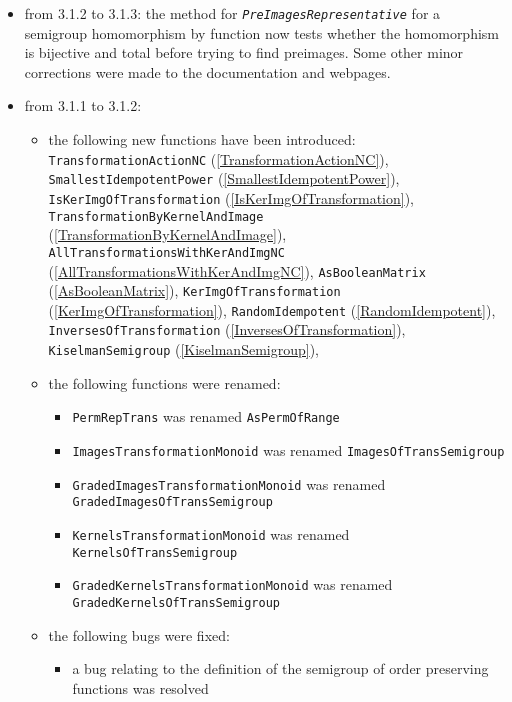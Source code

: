 \documentclass[a4paper,11pt]{report}
\begin{document}
{{\begin{itemize}
\item from 3.1.2 to 3.1.3: the method for \mbox{\texttt{\slshape PreImagesRepresentative}} for a semigroup homomorphism by function now tests whether the homomorphism is
bijective and total before trying to find preimages. Some other minor
corrections were made to the documentation and webpages.
\item from 3.1.1 to 3.1.2: 
\begin{itemize}
\item the following new functions have been introduced: \texttt{TransformationActionNC} (\ref{TransformationActionNC}), \texttt{SmallestIdempotentPower} (\ref{SmallestIdempotentPower}), \texttt{IsKerImgOfTransformation} (\ref{IsKerImgOfTransformation}), \texttt{TransformationByKernelAndImage} (\ref{TransformationByKernelAndImage}), \texttt{AllTransformationsWithKerAndImgNC} (\ref{AllTransformationsWithKerAndImgNC}), \texttt{AsBooleanMatrix} (\ref{AsBooleanMatrix}), \texttt{KerImgOfTransformation} (\ref{KerImgOfTransformation}), \texttt{RandomIdempotent} (\ref{RandomIdempotent}), \texttt{InversesOfTransformation} (\ref{InversesOfTransformation}), \texttt{KiselmanSemigroup} (\ref{KiselmanSemigroup}), 
\item the following functions were renamed: 
\begin{itemize}
\item  \texttt{PermRepTrans} was renamed \texttt{AsPermOfRange}
\item  \texttt{ImagesTransformationMonoid} was renamed \texttt{ImagesOfTransSemigroup}
\item  \texttt{GradedImagesTransformationMonoid} was renamed \texttt{GradedImagesOfTransSemigroup}
\item  \texttt{KernelsTransformationMonoid} was renamed \texttt{KernelsOfTransSemigroup}
\item  \texttt{GradedKernelsTransformationMonoid} was renamed \texttt{GradedKernelsOfTransSemigroup}
\end{itemize}

\item the following bugs were fixed: 
\begin{itemize}
\item  a bug relating to the definition of the semigroup of order preserving
functions was resolved
\end{itemize}

\end{itemize}


\end{itemize}}}
\end{document}
